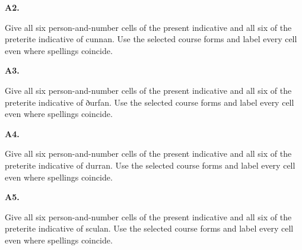 \par\begin{minipage}{\linewidth}\raggedright
\textbf{A2.}

Give all six person-and-number cells of the present indicative and all six of the preterite indicative of cunnan. Use the selected course forms and label every cell even where spellings coincide.

\end{minipage}\par\addvspace{4pt}

\par\begin{minipage}{\linewidth}\raggedright
\textbf{A3.}

Give all six person-and-number cells of the present indicative and all six of the preterite indicative of ðurfan. Use the selected course forms and label every cell even where spellings coincide.

\end{minipage}\par\addvspace{4pt}

\par\begin{minipage}{\linewidth}\raggedright
\textbf{A4.}

Give all six person-and-number cells of the present indicative and all six of the preterite indicative of durran. Use the selected course forms and label every cell even where spellings coincide.

\end{minipage}\par\addvspace{4pt}

\par\begin{minipage}{\linewidth}\raggedright
\textbf{A5.}

Give all six person-and-number cells of the present indicative and all six of the preterite indicative of sculan. Use the selected course forms and label every cell even where spellings coincide.

\end{minipage}\par\addvspace{4pt}

